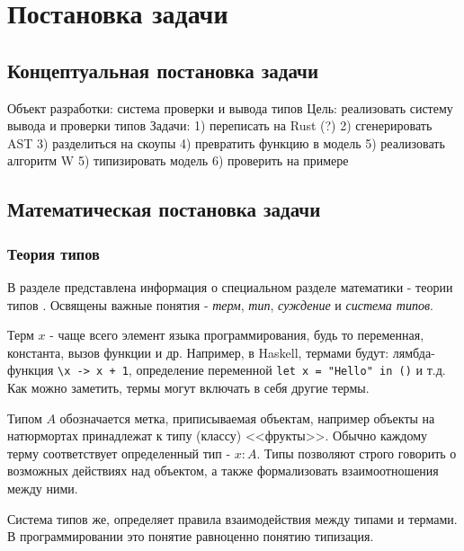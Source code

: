 \chapter{Постановка задачи}
\label{ch:task}

\section{Концептуальная постановка задачи}
\label{sec:abstract_task}

Объект разработки: система проверки и вывода типов
Цель: реализовать систему вывода и проверки типов
Задачи:
    1) переписать на Rust (?)
    2) сгенерировать AST
    3) разделиться на скоупы
    4) превратить функцию в модель
    5) реализовать алгоритм W
    5) типизировать модель
    6) проверить на примере


\section{Математическая постановка задачи}
\label{sec:math_task}

\subsection{Теория типов}
\label{subsec:type_theory}

В разделе представлена информация о специальном разделе математики - теории типов \cite{TypeTheoryBook}.
Освящены важные понятия - \textit{терм}, \textit{тип}, \textit{суждение} и \textit{система типов}.

Терм $x$ - чаще всего элемент языка программирования, будь то переменная, константа, вызов функции и др.
Например, в Haskell, термами будут: лямбда-функция \lstinline{\x -> x + 1}, определение переменной \lstinline{let x = "Hello" in ()} и т.д.
Как можно заметить, термы могут включать в себя другие термы.

Типом $A$ обозначается метка, приписываемая объектам, например объекты на натюрмортах принадлежат к типу (классу) <<фрукты>>.
Обычно каждому терму соответствует определенный тип - $x: A$.
Типы позволяют строго говорить о возможных действиях над объектом, а также формализовать взаимоотношения между ними.

Система типов же, определяет правила взаимодействия между типами и термами.
В программировании это понятие равноценно понятию типизация.

